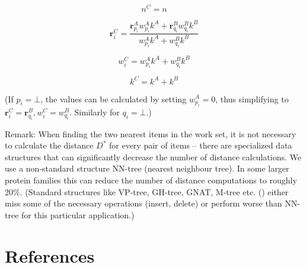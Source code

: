 \documentclass{article}
\begin{document}
\[  n^C = n  \]

\[  \mathbf{r}^C_i = \frac {\mathbf{r}^A_{p_i} w^A_{p_i} k^A + \mathbf{r}^B_{q_i} w^B_{q_i} k^B} {w^A_{p_i} k^A + w^B_{q_i} k^B}  \]

\[  w^C_i = w^A_{p_i} k^A + w^B_{q_i} k^B  \]

\[  k^C = k^A + k^B  \]

(If \(p_i=\bot\), the values can be calculated by setting
\(w^A_{p_i} = 0\), thus simplifying to
\(\mathbf{r}^C_i = \mathbf{r}^B_{q_i}, w^C_i = w^B_{q_i}\). Similarly for \(q_i=\bot\).)

Remark: When finding the two nearest items in the work set, it is not
necessary to calculate the distance \(D^*\) for every pair of items --
there are specialized data structures that can significantly decrease
the number of distance calculations. We use a non-standard structure
NN-tree (nearest neighbour tree). In some larger protein families this
can reduce the number of distance computations to roughly 20\%. 
(Standard structures like VP-tree, GH-tree, GNAT, M-tree etc. 
() either miss some of
the necessary operations (insert, delete) or perform worse than NN-tree
for this particular application.)




\section{References}
\end{document}
